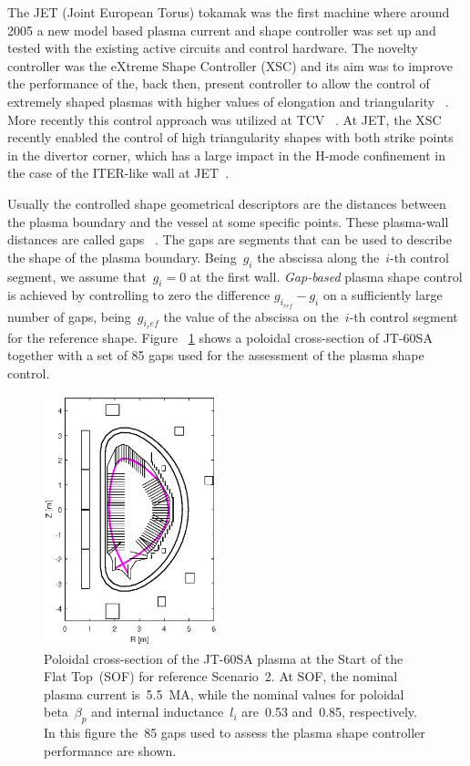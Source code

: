The JET (Joint European Torus) tokamak was the first machine where around 2005 a new model based plasma current and shape controller was set up and tested  with the existing active circuits and control hardware. The novelty controller was the eXtreme Shape Controller (XSC) and its aim was to improve  the performance of the, back then, present controller to allow the control of extremely shaped plasmas with higher values of elongation and triangularity ~\cite{Albanese2005}. More recently this control approach was utilized at TCV ~\cite{anand2017novel}. At JET, the XSC recently enabled the control of high triangularity shapes with both strike points in the divertor corner, which has a large impact in the H-mode confinement in the case of the ITER-like wall at JET~\cite{de2016recent}.   
 \smallskip
 
 Usually the controlled shape geometrical descriptors are the distances between the plasma boundary and the vessel at some specific points. These plasma-wall distances are called gaps ~\cite{Ambrosino:TCST2008}. The gaps are segments that can be used to describe the shape of the plasma boundary. Being~$g_i$ the abscissa along the~$i$-th control segment, we assume that~$g_i=0$ at the first wall. \emph{Gap-based} plasma shape control is achieved by controlling to zero the difference $g_{i_{ref}}-g_i$ on a sufficiently large number of gaps, being~$g_{i_ref}$ the value of the abscissa on the~$i$-th control segment for the reference shape. Figure ~\ref{figure:85_gaps} shows a poloidal cross-section of JT-60SA together with a set of 85 gaps used for the assessment of the plasma shape control.
 \smallskip
 
 \begin{figure}[h]
 	\begin{center}
 		\includegraphics[width=0.45\textwidth]{Chp3/85_gaps_2.eps}
 	\end{center}\caption{Poloidal cross-section of the JT-60SA plasma at the Start of the Flat Top~(SOF) for reference Scenario~2. At SOF, the nominal plasma current is~5.5~MA, while the nominal values for poloidal beta~$\beta_p$ and internal inductance~$l_i$ are~0.53 and~0.85, respectively. In this figure the~85 gaps used to assess the plasma shape controller performance are shown.}\label{figure:85_gaps}
 \end{figure}
 
